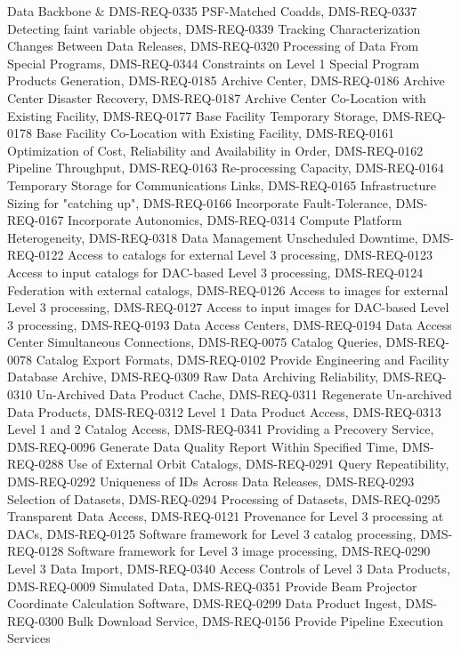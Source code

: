 Data Backbone & DMS-REQ-0335 PSF-Matched Coadds, DMS-REQ-0337 Detecting faint variable objects, DMS-REQ-0339 Tracking Characterization Changes Between Data Releases, DMS-REQ-0320 Processing of Data From Special Programs, DMS-REQ-0344 Constraints on Level 1 Special Program Products Generation, DMS-REQ-0185 Archive Center, DMS-REQ-0186 Archive Center Disaster Recovery, DMS-REQ-0187 Archive Center Co-Location with Existing Facility, DMS-REQ-0177 Base Facility Temporary Storage, DMS-REQ-0178 Base Facility Co-Location with Existing Facility, DMS-REQ-0161 Optimization of Cost, Reliability and Availability in Order, DMS-REQ-0162 Pipeline Throughput, DMS-REQ-0163 Re-processing Capacity, DMS-REQ-0164 Temporary Storage for Communications Links, DMS-REQ-0165 Infrastructure Sizing for "catching up", DMS-REQ-0166 Incorporate Fault-Tolerance, DMS-REQ-0167 Incorporate Autonomics, DMS-REQ-0314 Compute Platform Heterogeneity, DMS-REQ-0318 Data Management Unscheduled Downtime, DMS-REQ-0122 Access to catalogs for external Level 3 processing, DMS-REQ-0123 Access to input catalogs for DAC-based Level 3 processing, DMS-REQ-0124 Federation with external catalogs, DMS-REQ-0126 Access to images for external Level 3 processing, DMS-REQ-0127 Access to input images for DAC-based Level 3 processing, DMS-REQ-0193 Data Access Centers, DMS-REQ-0194 Data Access Center Simultaneous Connections, DMS-REQ-0075 Catalog Queries, DMS-REQ-0078 Catalog Export Formats, DMS-REQ-0102 Provide Engineering and Facility Database Archive, DMS-REQ-0309 Raw Data Archiving Reliability, DMS-REQ-0310 Un-Archived Data Product Cache, DMS-REQ-0311 Regenerate Un-archived Data Products, DMS-REQ-0312 Level 1 Data Product Access, DMS-REQ-0313 Level 1 and 2 Catalog Access, DMS-REQ-0341 Providing a Precovery Service, DMS-REQ-0096 Generate Data Quality Report Within Specified Time, DMS-REQ-0288 Use of External Orbit Catalogs, DMS-REQ-0291 Query Repeatibility, DMS-REQ-0292 Uniqueness of IDs Across Data Releases, DMS-REQ-0293 Selection of Datasets, DMS-REQ-0294 Processing of Datasets, DMS-REQ-0295 Transparent Data Access, DMS-REQ-0121 Provenance for Level 3 processing at DACs, DMS-REQ-0125 Software framework for Level 3 catalog processing, DMS-REQ-0128 Software framework for Level 3 image processing, DMS-REQ-0290 Level 3 Data Import, DMS-REQ-0340 Access Controls of Level 3 Data Products, DMS-REQ-0009 Simulated Data, DMS-REQ-0351 Provide Beam Projector Coordinate Calculation Software, DMS-REQ-0299 Data Product Ingest, DMS-REQ-0300 Bulk Download Service, DMS-REQ-0156 Provide Pipeline Execution Services\\\hline
